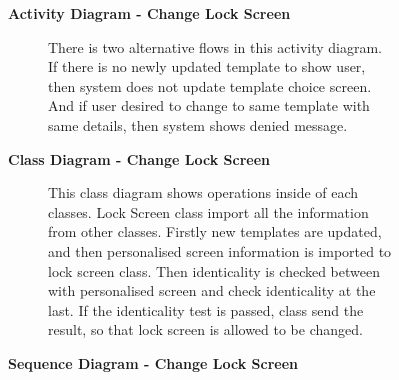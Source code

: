 \documentclass{article}
\begin{document}
		\begin{figure}[htbp]
			\textbf{Activity Diagram - Change Lock Screen}
			\centering
			\begin{subfigure}{\textwidth}
				\centering
				\scalebox{0.9}{}
			\end{subfigure}
			\begin{subfigure}{\textwidth}
				There is two alternative flows in this activity diagram. If there is no newly updated template to show user, then system does not update template choice screen. And if user desired to change to same template with same details, then system shows denied message.
			\end{subfigure}
		\end{figure}
		\clearpage
		
		\begin{figure}[htbp]
			\textbf{Class Diagram - Change Lock Screen}
			\centering
			\begin{subfigure}{\textwidth}
				\resizebox{\textwidth}{!}{}
			\end{subfigure}
			\begin{subfigure}{\textwidth}
				This class diagram shows operations inside of each classes. Lock Screen class import all the information from other classes. Firstly new templates are updated, and then personalised screen information is imported to lock screen class. Then identicality is checked between with personalised screen and check identicality at the last. If the identicality test is passed, class send the result, so that lock screen is allowed to be changed.
			\end{subfigure}
		\end{figure}
		\clearpage
		
		\begin{figure}[htbp]
			\textbf{Sequence Diagram - Change Lock Screen}
			\centering
			\begin{subfigure}{\textwidth}
				\centering
				\scalebox{0.7}{}
			\end{subfigure}
		\end{figure}

		\clearpage
		
		
\end{document}
